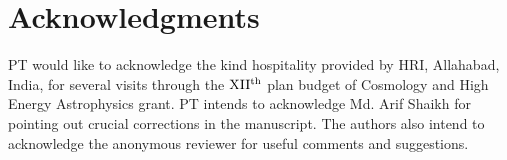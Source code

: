 \documentclass[10pt,authoryear]{article}
\begin{document}
\section*{Acknowledgments}
PT would like to acknowledge the kind hospitality provided by HRI, Allahabad, India, for several 
visits through the $\rm{XII^{th}}$ plan budget of Cosmology and High Energy Astrophysics grant. 
PT intends to acknowledge Md. Arif Shaikh for pointing out crucial corrections in the manuscript. 
The authors also intend to acknowledge the anonymous reviewer for useful comments and suggestions.



\end{document}
